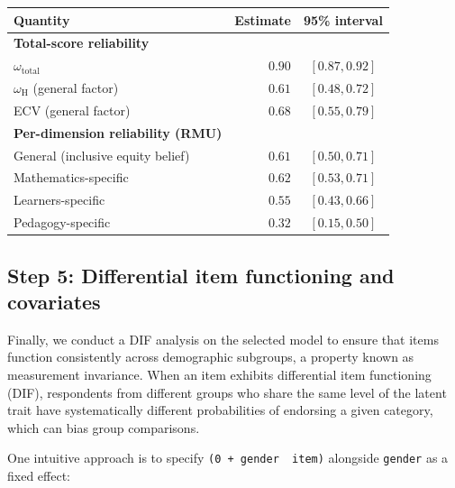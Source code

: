 \documentclass[
  man,
  floatsintext,
  longtable,
  nolmodern,
  notxfonts,
  notimes,
  colorlinks=true,linkcolor=blue,citecolor=blue,urlcolor=blue]{apa7}
\begin{document}
\begin{table}

{\caption{{Reliability of the final model (\texttt{bf\_grm\_20}),
computed over the full posterior. Total-score coefficients are
model-based omega (); per-dimension entries are the relative measurement uncertainty
(RMU) reliability with its 95\% HDCI.}{\label{tbl-reliability}}}
\vspace{-20pt}}

\begin{longtable}[]{@{}lrc@{}}
\toprule\noalign{}
Quantity & Estimate & 95\% interval \\
\midrule\noalign{}
\endhead
\bottomrule\noalign{}
\endlastfoot
\textbf{Total-score reliability} & & \\
\(\omega_{\text{total}}\) & \(0.90\) & \([0.87, 0.92]\) \\
\(\omega_{\mathrm{H}}\) (general factor) & \(0.61\) &
\([0.48, 0.72]\) \\
ECV (general factor) & \(0.68\) & \([0.55, 0.79]\) \\
\textbf{Per-dimension reliability (RMU)} & & \\
General (inclusive equity belief) & \(0.61\) & \([0.50, 0.71]\) \\
Mathematics-specific & \(0.62\) & \([0.53, 0.71]\) \\
Learners-specific & \(0.55\) & \([0.43, 0.66]\) \\
Pedagogy-specific & \(0.32\) & \([0.15, 0.50]\) \\
\end{longtable}

\end{table}

\subsection{Step 5: Differential item functioning and
covariates}\label{step-5-differential-item-functioning-and-covariates}

Finally, we conduct a DIF analysis on the selected model to ensure that
items function consistently across demographic subgroups, a property
known as measurement invariance. When an item exhibits differential item
functioning (DIF), respondents from different groups who share the same
level of the latent trait have systematically different probabilities of
endorsing a given category, which can bias group comparisons.

One intuitive approach is to specify
\texttt{(0\ +\ gender\ \textbar{}\ item)} alongside \texttt{gender} as a
fixed effect:
\end{document}
